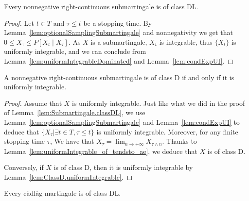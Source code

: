 \begin{lemma}\label{lem:Submartingale.classDL}
  \leanok
Every nonnegative right-continuous submartingale is of class DL.
\end{lemma}

\begin{proof}
  \leanok
Let $t \in T$ and $\tau \le t$ be a stopping time. By Lemma~\ref{lem:optionalSamplingSubmartingale} and nonnegativity we get that $0 \le X_\tau \le P[X_t \mid X_\tau]$. As $X$ is a submartingale, $X_t$ is integrable, thus $\{X_t\}$ is uniformly integrable, and we can conclude from Lemma~\ref{lem:uniformIntegrableDominated} and Lemma~\ref{lem:condExpUI}.
\end{proof}


\begin{lemma}\label{lem:Submartingale.classD_iff_uniformIntegrable}
  \leanok
A nonnegative right-continuous submartingale is of class D if and only if it is uniformly integrable.
\end{lemma}

\begin{proof}
  \leanok
Assume that $X$ is uniformly integrable. Just like what we did in the proof of Lemma~\ref{lem:Submartingale.classDL}, we use Lemma~\ref{lem:optionalSamplingSubmartingale} and Lemma~\ref{lem:condExpUI} to deduce that $\{X_\tau|\exists t\in T, \tau\le t\}$ is uniformly integrable. Moreover, for any finite stopping time $\tau$, We have that $X_\tau = \lim_{n \to +\infty} X_{\tau \land n}$. Thanks to Lemma~\ref{lem:uniformIntegrable_of_tendsto_ae}, we deduce that $X$ is of class D.

Conversely, if $X$ is of class D, then it is uniformly integrable by Lemma~\ref{lem:ClassD.uniformIntegrable}.
\end{proof}


\begin{lemma}\label{lem:Martingale.classDL}
  \leanok
Every càdlàg martingale is of class DL.
\end{lemma}

